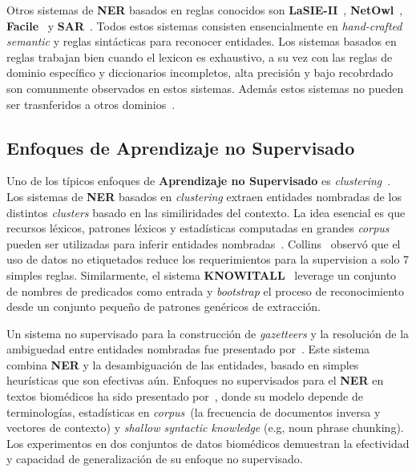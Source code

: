 Otros sistemas de \textbf{NER} basados en reglas conocidos son \textbf{LaSIE-II}~\cite{humphreys1998university}, \textbf{NetOwl}~\cite{krupka2005description}, \textbf{Facile}~\cite{black1998facile} y \textbf{SAR}~\cite{aone1998sra}. Todos estos sistemas consisten ensencialmente en \emph{hand-crafted semantic} y reglas sint\'acticas para reconocer entidades. Los sistemas basados en reglas trabajan bien cuando el lexicon es exhaustivo, a su vez con las reglas de dominio espec\'ifico y diccionarios incompletos, alta precisi\'on y bajo recobrdado son comunmente observados en estos sistemas. Adem\'as estos sistemas no pueden ser trasnferidos a otros dominios~\cite{li2018survey}.


\subsection{Enfoques de Aprendizaje no Supervisado}  

Uno de los t\'ipicos enfoques de \textbf{Aprendizaje no Supervisado} es \emph{clustering}~\cite{nadeau2007survey}. Los sistemas de \textbf{NER} basados en \emph{clustering} extraen entidades nombradas de los distintos \emph{clusters} basado en las similiridades del contexto. La idea esencial es que recursos l\'exicos, patrones l\'exicos y estad\'isticas computadas en grandes \emph{corpus} pueden ser utilizadas para inferir entidades nombradas~\cite{li2018survey}. Collins~\cite{collins1999unsupervised} observ\'o que el uso de datos no etiquetados reduce los requerimientos para la supervision a solo 7 simples reglas. Similarmente, el sistema \textbf{KNOWITALL}~\cite{etzioni2005unsupervised} leverage un conjunto de nombres de predicados como entrada y \emph{bootstrap} el proceso de reconocimiento desde un conjunto peque\~no de patrones gen\'ericos de extracci\'on.

Un sistema no supervisado para la construcci\'on de \emph{gazetteers} y la resoluci\'on de la ambiguedad entre entidades nombradas fue presentado por~\cite{nadeau2006unsupervised}. Este sistema combina \textbf{NER} y la 
desambiguación de las entidades, basado en simples heur\'isticas que son efectivas a\'un. Enfoques no supervisados para el \textbf{NER} en textos biom\'edicos ha sido presentado por~\cite{zhang2013unsupervised}, donde su modelo depende de terminolog\'ias, estad\'isticas en \emph{corpus}~(la frecuencia de documentos inversa y vectores de contexto) y \emph{shallow syntactic knowledge} (e.g, noun phrase chunking). Los experimentos en dos conjuntos de datos biom\'edicos demuestran la efectividad y capacidad de generalizaci\'on de su enfoque no supervisado.


